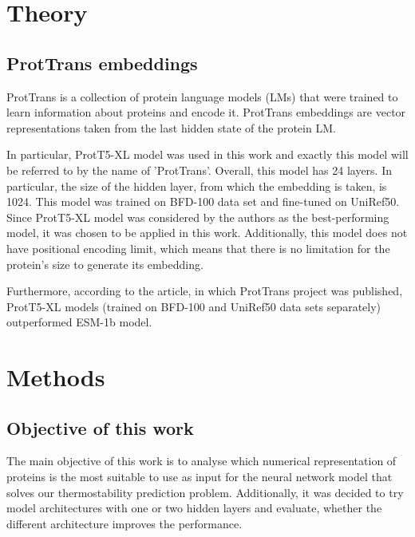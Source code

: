\documentclass[12pt]{article}
\begin{document}
	\newpage

	\section{Theory}

	\subsection{ProtTrans embeddings}

	ProtTrans \cite{elnaggar2020prottrans} is a collection 
	of protein language models 
	(LMs) that were trained to learn information about 
	proteins and encode it. ProtTrans embeddings are vector 
	representations taken from the last hidden state of 
	the protein LM. 

	In particular, ProtT5-XL model was used in this work and 
	exactly this model will be referred to by the name of 
	'ProtTrans'. Overall, this model has 24 layers. In particular, 
	the size of the hidden layer, from which the 
	embedding is taken, is 1024. This model was trained on 
	BFD-100 data set 
	and fine-tuned on UniRef50. Since ProtT5-XL model was 
	considered by the 
	authors as the best-performing model, it was chosen to be 
	applied in this work. Additionally, this model 
	does not have 
	positional encoding limit, which means that there is no 
	limitation for the protein's size to generate its embedding. 

	Furthermore, according to the article, in which ProtTrans
	project was published, ProtT5-XL models (trained on BFD-100 
	and UniRef50 data sets separately) 
	outperformed ESM-1b \cite{rives2021biological} model.

	\newpage

	\section{Methods}

	\subsection{Objective of this work}

	The main objective of this work is to analyse 
	which numerical representation of proteins is the most 
	suitable to use as input for the neural network 
	model that solves our thermostability prediction problem. 
	Additionally, it was decided to try model 
	architectures with one or two hidden layers and evaluate, 
	whether the different architecture improves the 
	performance.
\end{document}
